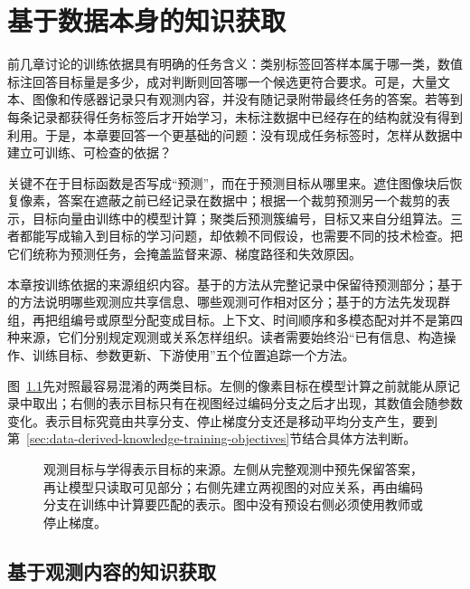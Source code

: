 \chapter{基于数据本身的知识获取}
\label{chap:data-derived-knowledge-acquisition}

前几章讨论的训练依据具有明确的任务含义：类别标签回答样本属于哪一类，数值标注回答目标量是多少，成对判断则回答哪一个候选更符合要求。可是，大量文本、图像和传感器记录只有观测内容，并没有随记录附带最终任务的答案。若等到每条记录都获得任务标签后才开始学习，未标注数据中已经存在的结构就没有得到利用。于是，本章要回答一个更基础的问题：没有现成任务标签时，怎样从数据中建立可训练、可检查的依据？

关键不在于目标函数是否写成“预测”，而在于预测目标从哪里来。遮住图像块后恢复像素，答案在遮蔽之前已经记录在数据中；根据一个裁剪预测另一个裁剪的表示，目标向量由训练中的模型计算；聚类后预测簇编号，目标又来自分组算法。三者都能写成输入到目标的学习问题，却依赖不同假设，也需要不同的技术检查。把它们统称为预测任务，会掩盖监督来源、梯度路径和失效原因。

本章按训练依据的来源组织内容。基于的方法从完整记录中保留待预测部分；基于的方法说明哪些观测应共享信息、哪些观测可作相对区分；基于的方法先发现群组，再把组编号或原型分配变成目标。上下文、时间顺序和多模态配对并不是第四种来源，它们分别规定观测或关系怎样组织。读者需要始终沿“已有信息、构造操作、训练目标、参数更新、下游使用”五个位置追踪一个方法。

图~\ref{fig:data-derived-knowledge-target-sources}先对照最容易混淆的两类目标。左侧的像素目标在模型计算之前就能从原记录中取出；右侧的表示目标只有在视图经过编码分支之后才出现，其数值会随参数变化。表示目标究竟由共享分支、停止梯度分支还是移动平均分支产生，要到第~\ref{sec:data-derived-knowledge-training-objectives}节结合具体方法判断。

\begin{figure}[htbp]
  \centering
  
  \caption{观测目标与学得表示目标的来源。左侧从完整观测中预先保留答案，再让模型只读取可见部分；右侧先建立两视图的对应关系，再由编码分支在训练中计算要匹配的表示。图中没有预设右侧必须使用教师或停止梯度。}
  \label{fig:data-derived-knowledge-target-sources}
\end{figure}
\FloatBarrier

\section{基于观测内容的知识获取}
\label{sec:data-derived-knowledge-observation}

